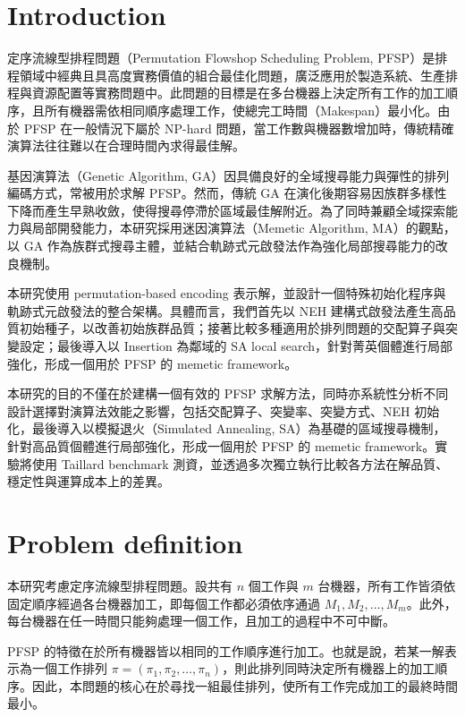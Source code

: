\documentclass[conference]{IEEEtran}
\begin{document}
\section{Introduction}
定序流線型排程問題（Permutation Flowshop Scheduling Problem, PFSP）是排程領域中經典且具高度實務價值的組合最佳化問題，廣泛應用於製造系統、生產排程與資源配置等實務問題中。此問題的目標是在多台機器上決定所有工作的加工順序，且所有機器需依相同順序處理工作，使總完工時間（Makespan）最小化。由於 PFSP 在一般情況下屬於 NP-hard 問題，當工作數與機器數增加時，傳統精確演算法往往難以在合理時間內求得最佳解。

基因演算法（Genetic Algorithm, GA）因具備良好的全域搜尋能力與彈性的排列編碼方式，常被用於求解 PFSP。然而，傳統 GA 在演化後期容易因族群多樣性下降而產生早熟收斂，使得搜尋停滯於區域最佳解附近。為了同時兼顧全域探索能力與局部開發能力，本研究採用迷因演算法（Memetic Algorithm, MA）的觀點，以 GA 作為族群式搜尋主體，並結合軌跡式元啟發法作為強化局部搜尋能力的改良機制。

本研究使用 permutation-based encoding 表示解，並設計一個特殊初始化程序與軌跡式元啟發法的整合架構。具體而言，我們首先以 NEH 建構式啟發法產生高品質初始種子，以改善初始族群品質；接著比較多種適用於排列問題的交配算子與突變設定；最後導入以 Insertion 為鄰域的 SA local search，針對菁英個體進行局部強化，形成一個用於 PFSP 的 memetic framework。

本研究的目的不僅在於建構一個有效的 PFSP 求解方法，同時亦系統性分析不同設計選擇對演算法效能之影響，包括交配算子、突變率、突變方式、NEH 初始化，最後導入以模擬退火（Simulated Annealing, SA）為基礎的區域搜尋機制，針對高品質個體進行局部強化，形成一個用於 PFSP 的 memetic framework。實驗將使用 Taillard benchmark 測資，並透過多次獨立執行比較各方法在解品質、穩定性與運算成本上的差異。




\section{Problem definition}
本研究考慮定序流線型排程問題。設共有 \(n\) 個工作與 \(m\) 台機器，所有工作皆須依固定順序經過各台機器加工，即每個工作都必須依序通過 \(M_1, M_2, \dots, M_m\)。此外，每台機器在任一時間只能夠處理一個工作，且加工的過程中不可中斷。

PFSP 的特徵在於所有機器皆以相同的工作順序進行加工。也就是說，若某一解表示為一個工作排列 \(\pi = (\pi_1, \pi_2, \dots, \pi_n)\)，則此排列同時決定所有機器上的加工順序。因此，本問題的核心在於尋找一組最佳排列，使所有工作完成加工的最終時間最小。
\end{document}
